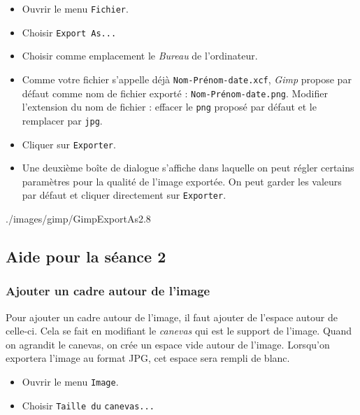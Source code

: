 \begin{itemize}
\item Ouvrir le menu \texttt{Fichier}.
\item Choisir \texttt{Export As...}
\item Choisir comme emplacement le \emph{Bureau} de l'ordinateur.
\item Comme votre fichier s'appelle déjà \texttt{Nom-Prénom-date.xcf}, \emph{Gimp} propose par défaut comme nom de fichier exporté : \texttt{Nom-Prénom-date.png}. Modifier l'extension du nom de fichier : effacer le \texttt{png} proposé par défaut et le remplacer par \texttt{jpg}.
\item Cliquer sur \texttt{Exporter}.
\item Une deuxième boîte de dialogue s'affiche dans laquelle on peut régler certains paramètres pour la qualité de l'image exportée. On peut garder les valeurs par défaut et cliquer directement sur \texttt{Exporter}.
\end{itemize}
%
		      {./images/gimp/GimpExportAs2}{.8\textwidth}

\subsection{Aide pour la séance 2}


\subsubsection{Ajouter un cadre autour de l'image}\label{GimpCadre}

Pour ajouter un cadre autour de l'image, il faut ajouter de l'espace autour de celle-ci. Cela se fait en modifiant le \emph{canevas} qui est le support de l'image. Quand on agrandit le canevas, on crée un espace vide autour de l'image. Lorsqu'on exportera l'image au format JPG, cet espace sera rempli de blanc.


\begin{minipage}[c]{.38\textwidth}
\begin{itemize}
\item Ouvrir le menu \texttt{Image}.
\item Choisir \texttt{Taille du} \texttt{canevas...}
\end{itemize}
\end{minipage}\hfill%
\begin{minipage}[c]{.58\textwidth}
\end{minipage}

